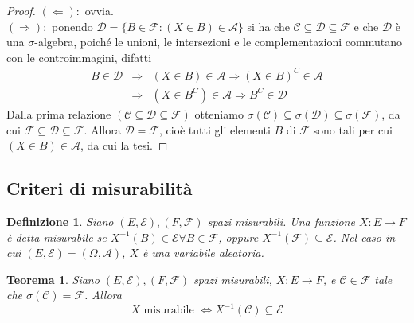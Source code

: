 \documentclass[a4paper,12pt]{article}
\theoremstyle{break}
\newtheorem{theorem}{Teorema}[section]
\newtheorem{definition}{Definizione}[section]
\numberwithin{equation}{section}
\begin{document}
\begin{proof}
  \(( \Longleftarrow ):\) ovvia. \\
  \((\Longrightarrow):\) ponendo \(\mathcal{D} = \{B \in \mathcal{F} : (X \in B) \in \mathcal{A}\}\) si ha che \(\mathcal{C} \subseteq \mathcal{D} \subseteq \mathcal{F}\) e che \(\mathcal{D}\) è una \(\sigma\)-algebra, poiché le unioni, le intersezioni e le complementazioni commutano con le controimmagini, difatti 
  \[
    \begin{array}{ccc}
      B \in \mathcal{D} & \Longrightarrow & (X \in B) \in \mathcal{A} \Longrightarrow (X \in B)^C \in \mathcal{A} \\
      & \Longrightarrow & (X \in B^C) \in \mathcal{A} \Longrightarrow B^C \in \mathcal{D}
    \end{array} 
  \]
Dalla prima relazione \((\mathcal{C} \subseteq \mathcal{D} \subseteq \mathcal{F})\) otteniamo \(\sigma (\mathcal{C}) \subseteq \sigma(\mathcal{D}) \subseteq \sigma(\mathcal{F})\), da cui \(\mathcal{F} \subseteq \mathcal{D} \subseteq \mathcal{F}\). Allora \(\mathcal{D} = \mathcal{F}\), cioè tutti gli elementi \(B\) di \(\mathcal{F}\) sono tali per cui \((X \in B) \in \mathcal{A}\), da cui la tesi.
\end{proof}
\subsection{Criteri di misurabilità}
\begin{definition}
  Siano \((E, \mathcal{E}), (F, \mathcal{F})\) spazi misurabili. Una funzione \(X : E \longrightarrow F\) è detta misurabile se \(X^{-1} (B) \in \mathcal{E} \forall B \in \mathcal{F}\), oppure \(X^{-1} (\mathcal{F}) \subseteq \mathcal{E}\).
  Nel caso in cui \((E, \mathcal{E}) = (\Omega, \mathcal{A})\), \(X\) è una variabile aleatoria. 
\end{definition} 
\begin{theorem}
  Siano \((E, \mathcal{E}), (F, \mathcal{F})\) spazi misurabili, \(X : E \longrightarrow F\), e \(\mathcal{C} \in \mathcal{F}\) tale che \(\sigma(\mathcal{C}) = \mathcal{F}\). Allora
  \[
    X \mbox{ misurabile } \Longleftrightarrow X^{-1}(\mathcal{C}) \subseteq \mathcal{E}
  \] 
\end{theorem}
\end{document}
